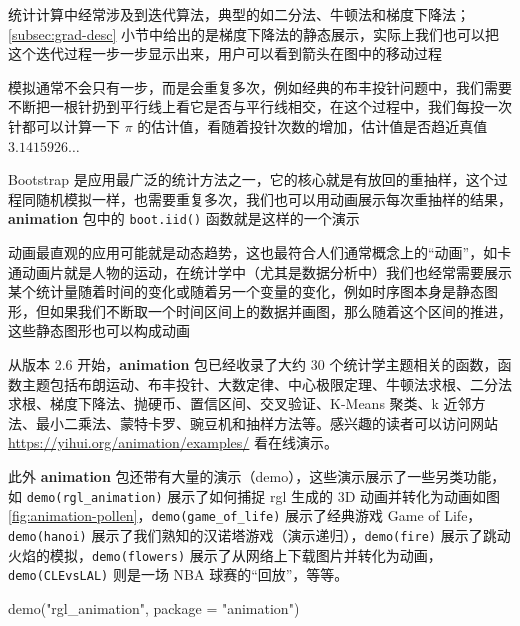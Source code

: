 \documentclass[
  b5paper,
  UTF8,twoside]{book}
\newenvironment{Shaded}{\begin{snugshade}}{\end{snugshade}}
\newcommand{\AttributeTok}[1]{\textcolor[rgb]{0.77,0.63,0.00}{#1}}
\newcommand{\FunctionTok}[1]{\textcolor[rgb]{0.00,0.00,0.00}{#1}}
\newcommand{\NormalTok}[1]{#1}
\newcommand{\StringTok}[1]{\textcolor[rgb]{0.31,0.60,0.02}{#1}}
\providecommand{\tightlist}{%
  \setlength{\itemsep}{0pt}\setlength{\parskip}{0pt}}
\begin{document}
\begin{description}
\tightlist
\item[迭代算法]
统计计算中经常涉及到迭代算法，典型的如二分法、牛顿法和梯度下降法；\ref{subsec:grad-desc} 小节中给出的是梯度下降法的静态展示，实际上我们也可以把这个迭代过程一步一步显示出来，用户可以看到箭头在图中的移动过程
\item[随机模拟]
模拟通常不会只有一步，而是会重复多次，例如经典的布丰投针问题中，我们需要不断把一根针扔到平行线上看它是否与平行线相交，在这个过程中，我们每投一次针都可以计算一下 \(\pi\) 的估计值，看随着投针次数的增加，估计值是否趋近真值 \(3.1415926\ldots\)
\item[重抽样]
Bootstrap 是应用最广泛的统计方法之一，它的核心就是有放回的重抽样，这个过程同随机模拟一样，也需要重复多次，我们也可以用动画展示每次重抽样的结果，\textbf{animation} 包中的 \texttt{boot.iid()} 函数就是这样的一个演示
\item[动态趋势]
动画最直观的应用可能就是动态趋势，这也最符合人们通常概念上的``动画''，如卡通动画片就是人物的运动，在统计学中（尤其是数据分析中）我们也经常需要展示某个统计量随着时间的变化或随着另一个变量的变化，例如时序图本身是静态图形，但如果我们不断取一个时间区间上的数据并画图，那么随着这个区间的推进，这些静态图形也可以构成动画
\end{description}

从版本 2.6 开始，\textbf{animation} 包已经收录了大约 30 个统计学主题相关的函数，函数主题包括布朗运动、布丰投针、大数定律、中心极限定理、牛顿法求根、二分法求根、梯度下降法、抛硬币、置信区间、交叉验证、K-Means 聚类、k 近邻方法、最小二乘法、蒙特卡罗、豌豆机和抽样方法等。感兴趣的读者可以访问网站 \url{https://yihui.org/animation/examples/} 看在线演示。

此外 \textbf{animation} 包还带有大量的演示（demo），这些演示展示了一些另类功能，如 \texttt{demo(\textquotesingle{}rgl\_animation\textquotesingle{})} 展示了如何捕捉 rgl 生成的 3D 动画并转化为动画如图 \ref{fig:animation-pollen}，\texttt{demo(\textquotesingle{}game\_of\_life\textquotesingle{})} 展示了经典游戏 Game of Life，\texttt{demo(\textquotesingle{}hanoi\textquotesingle{})} 展示了我们熟知的汉诺塔游戏（演示递归），\texttt{demo(\textquotesingle{}fire\textquotesingle{})} 展示了跳动火焰的模拟，\texttt{demo(\textquotesingle{}flowers\textquotesingle{})} 展示了从网络上下载图片并转化为动画，\texttt{demo(\textquotesingle{}CLEvsLAL\textquotesingle{})} 则是一场 NBA 球赛的``回放''，等等。

\begin{Shaded}
\begin{Highlighting}[]
\FunctionTok{demo}\NormalTok{(}\StringTok{"rgl\_animation"}\NormalTok{, }\AttributeTok{package =} \StringTok{"animation"}\NormalTok{)}
\end{Highlighting}
\end{Shaded}
\end{document}
